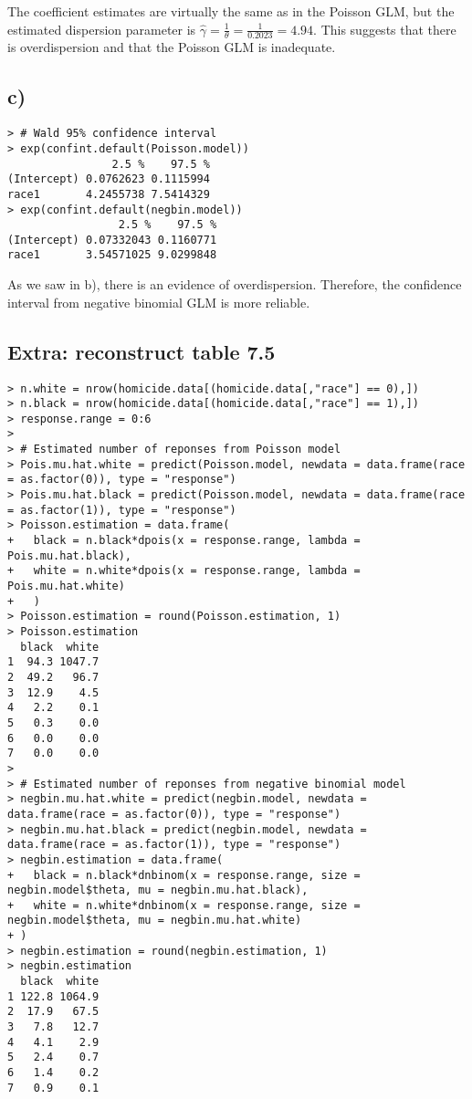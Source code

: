 \documentclass[a4paper]{article}
\begin{document}
The coefficient estimates are virtually the same as in the Poisson GLM, but the estimated dispersion parameter is $\widehat{\gamma} = \frac{1}{\theta} = \frac{1}{0.2023} = 4.94$. This suggests that there is overdispersion and that the Poisson GLM is inadequate.


\vspace{\baselineskip}
\subsection{c)}
\begin{lstlisting}
> # Wald 95% confidence interval
> exp(confint.default(Poisson.model))
                2.5 %    97.5 %
(Intercept) 0.0762623 0.1115994
race1       4.2455738 7.5414329
> exp(confint.default(negbin.model))
                 2.5 %    97.5 %
(Intercept) 0.07332043 0.1160771
race1       3.54571025 9.0299848
\end{lstlisting}

As we saw in b), there is an evidence of overdispersion. Therefore, the confidence interval from negative binomial GLM is more reliable.\\

\vspace{\baselineskip}
\subsection{Extra: reconstruct table 7.5}
\begin{lstlisting}
> n.white = nrow(homicide.data[(homicide.data[,"race"] == 0),])
> n.black = nrow(homicide.data[(homicide.data[,"race"] == 1),])
> response.range = 0:6
> 
> # Estimated number of reponses from Poisson model
> Pois.mu.hat.white = predict(Poisson.model, newdata = data.frame(race = as.factor(0)), type = "response")
> Pois.mu.hat.black = predict(Poisson.model, newdata = data.frame(race = as.factor(1)), type = "response")
> Poisson.estimation = data.frame(
+   black = n.black*dpois(x = response.range, lambda = Pois.mu.hat.black),
+   white = n.white*dpois(x = response.range, lambda = Pois.mu.hat.white)
+   )
> Poisson.estimation = round(Poisson.estimation, 1)
> Poisson.estimation
  black  white
1  94.3 1047.7
2  49.2   96.7
3  12.9    4.5
4   2.2    0.1
5   0.3    0.0
6   0.0    0.0
7   0.0    0.0
> 
> # Estimated number of reponses from negative binomial model
> negbin.mu.hat.white = predict(negbin.model, newdata = data.frame(race = as.factor(0)), type = "response")
> negbin.mu.hat.black = predict(negbin.model, newdata = data.frame(race = as.factor(1)), type = "response")
> negbin.estimation = data.frame(
+   black = n.black*dnbinom(x = response.range, size = negbin.model$theta, mu = negbin.mu.hat.black),
+   white = n.white*dnbinom(x = response.range, size = negbin.model$theta, mu = negbin.mu.hat.white)
+ )
> negbin.estimation = round(negbin.estimation, 1)
> negbin.estimation
  black  white
1 122.8 1064.9
2  17.9   67.5
3   7.8   12.7
4   4.1    2.9
5   2.4    0.7
6   1.4    0.2
7   0.9    0.1

\end{lstlisting}
\end{document}
